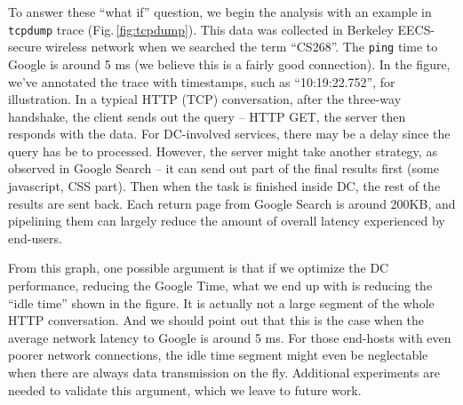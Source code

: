To answer these ``what if'' question, we begin the analysis with an example in \texttt{tcpdump} trace (Fig.\,\ref{fig:tcpdump}). This data was collected in Berkeley EECS-secure wireless network when we searched the term ``CS268''. The \texttt{ping} time to Google is around 5 ms (we believe this is a fairly good connection). In the figure, we've annotated the trace with timestamps, such as ``10:19:22.752'', for illustration. In a typical HTTP (TCP) conversation, after the three-way handshake, the client sends out the query -- HTTP GET, the server then responds with the data. For DC-involved services, there may be a delay since the query has be to processed. However, the server might take another strategy, as observed in Google Search -- it can send out part of the final results first (some javascript, CSS part). Then when the task is finished inside DC, the rest of the results are sent back. Each return page from Google Search is around 200KB, and pipelining them can largely reduce the amount of overall latency experienced by end-users. 

From this graph, one possible argument is that if we optimize the DC performance, reducing the Google Time, what we end up with is reducing the ``idle time'' shown in the figure. It is actually not a large segment of the whole HTTP conversation. And we should point out that this is the case when the average network latency to Google is around 5 ms. For those end-hosts with even poorer network connections, the idle time segment might even be neglectable when there are always data transmission on the fly. Additional experiments are needed to validate this argument, which we leave to future work.


